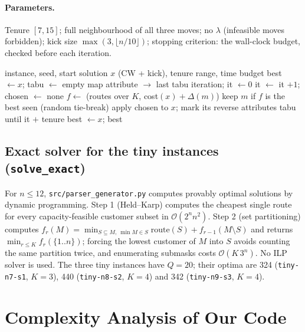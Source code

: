 \documentclass[11pt,a4paper]{article}
\theoremstyle{definition}
\theoremstyle{remark}
\newcommand{\code}[1]{\texttt{#1}}
\newcommand{\Ocal}{\mathcal{O}}
\begin{document}
\paragraph{Parameters.} Tenure $[7,15]$; full neighbourhood of all three moves; no
$\lambda$ (infeasible moves forbidden); kick size $\max(3,\lfloor n/10\rfloor)$; stopping
criterion: the wall-clock budget, checked before each iteration.

\begin{algorithm}[ht]
\caption{Tabu Search}\label{alg:ts}
\begin{algorithmic}[1]
\Require instance, seed, start solution $x$ (CW + kick), tenure range, time budget
\State best $\gets x$; tabu $\gets$ empty map attribute $\to$ last tabu iteration; it $\gets 0$
  \State it $\gets$ it $+1$; chosen $\gets$ none
    \State $f\gets$ (routes over $K$, cost$(x)+\Delta(m)$) \Comment{$\Delta$ in $\Ocal(1)$}
     keep $m$ if $f$ is the best seen (random tie-break) \EndIf
  \EndFor
    \State apply chosen to $x$; mark its reverse attributes tabu until it $+$ tenure
     best $\gets x$;  \EndIf
  \EndIf
\EndWhile
\State \Return best
\end{algorithmic}
\end{algorithm}

\subsection{Exact solver for the tiny instances (\code{solve\_exact})}
For $n\le 12$, \code{src/parser\_generator.py} computes provably optimal solutions by
dynamic programming. Step 1 (Held--Karp) computes the cheapest single route for every
capacity-feasible customer subset in $\Ocal(2^n n^2)$. Step 2 (set partitioning) computes
$f_r(M)=\min_{S\subseteq M,\ \min M\in S} \mathrm{route}(S) + f_{r-1}(M\setminus S)$ and
returns $\min_{r\le K} f_r(\{1..n\})$; forcing the lowest customer of $M$ into $S$ avoids
counting the same partition twice, and enumerating submasks costs $\Ocal(K\,3^n)$. No ILP
solver is used. The three tiny instances have $Q=20$; their optima are 324
(\code{tiny-n7-s1}, $K=3$), 440 (\code{tiny-n8-s2}, $K=4$) and 342 (\code{tiny-n9-s3},
$K=4$).

\section{Complexity Analysis of Our Code}\label{sec:complexity}
\end{document}
